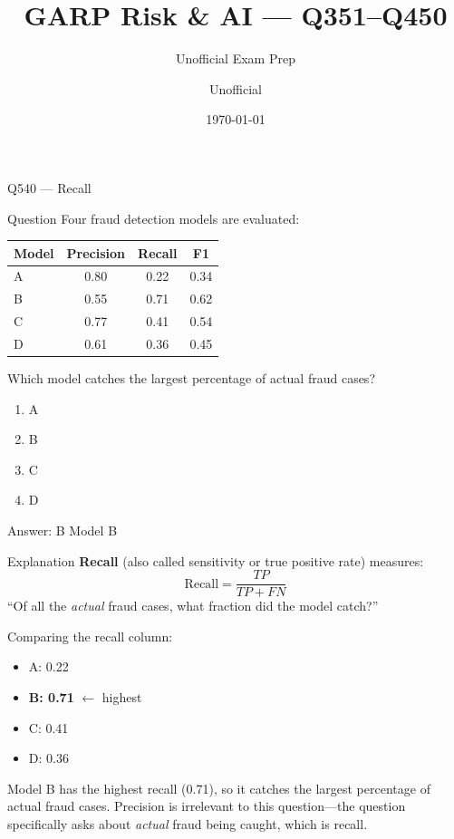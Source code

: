 \documentclass[aspectratio=169,8pt]{beamer}
\title[GARP RAI]{GARP Risk \& AI --- Q351--Q450}
\subtitle{Unofficial Exam Prep}
\author{Unofficial}
\date{\today}
\begin{document}
	
	\begin{frame}{Q540 --- Recall}
		\begin{block}{Question}
			Four fraud detection models are evaluated:
			
			\begin{center}
				\begin{tabular}{lccc}
					\hline
					Model & Precision & Recall & F1 \\
					\hline
					A & 0.80 & 0.22 & 0.34 \\
					B & 0.55 & 0.71 & 0.62 \\
					C & 0.77 & 0.41 & 0.54 \\
					D & 0.61 & 0.36 & 0.45 \\
					\hline
				\end{tabular}
			\end{center}
			
			Which model catches the largest percentage of actual fraud cases?
			\begin{enumerate}
				\item A
				\item B
				\item C
				\item D
			\end{enumerate}
		\end{block}
		
		\begin{exampleblock}{Answer: B}
			Model B
		\end{exampleblock}
		
		\begin{block}{Explanation}
			\textbf{Recall} (also called sensitivity or true positive rate) measures:
			\[
			\text{Recall} = \frac{TP}{TP+FN}
			\]
			``Of all the \emph{actual} fraud cases, what fraction did the model catch?''
			
			Comparing the recall column:
			\begin{itemize}
				\item A: 0.22
				\item \textbf{B: 0.71} \(\leftarrow\) highest
				\item C: 0.41
				\item D: 0.36
			\end{itemize}
			
			Model B has the highest recall (0.71), so it catches the largest percentage
			of actual fraud cases. Precision is irrelevant to this question---the question
			specifically asks about \emph{actual} fraud being caught, which is recall.
		\end{block}
	\end{frame}
	
\end{document}
